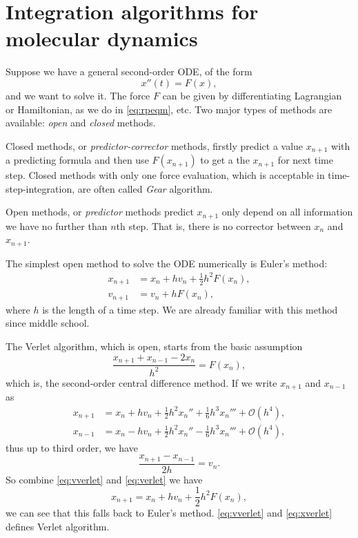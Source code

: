 
\section{Integration algorithms for molecular dynamics}

Suppose we have a general second-order ODE, of the form
\begin{equation}
  x''(t) = F(x),
\end{equation}
and we want to solve it. The force $F$ can be given by differentiating Lagrangian or Hamiltonian, as we do in \eqref{eq:rpeqm}, etc. Two major types of methods are
available: \textit{open} and \textit{closed} methods.

Closed methods, or \textit{predictor-corrector} methods, firstly predict a value
$x_{n+1}$ with a predicting formula and then use $F(x_{n+1})$ to get a the $x_{n+1}$
for next time step. Closed methods with only one force evaluation, which is acceptable in time-step-integration,
are often called \textit{Gear} algorithm.

Open methods, or \textit{predictor} methods predict $x_{n+1}$ only depend on all
information we have no further than $n$th step. That is, there is no corrector between
$x_{n}$ and $x_{n+1}$.

The simplest  open method to solve the ODE numerically is Euler's method:
\begin{align}
x_{n+1} &= x_n + h v_n + \frac{ 1 }{ 2 } h^2 F(x_n),\\
v_{n+1} &= v_n + h F(x_n),
\end{align}
where $h$ is the length of a time step. We are already familiar with this method
since middle school.

The Verlet algorithm, which is open, starts from the basic assumption
\begin{equation}\label{eq:verlet}
	\frac{ x_{n+1} + x_{n-1} - 2 x_n }{ h^2 } = F(x_n),
\end{equation}
which is, the second-order central difference method.
If we write $x_{n+1}$ and $x_{n-1}$ as
\begin{align}
 x_{n+1} &= x_n + h v_n + \frac{ 1 }{ 2 } h^2 x_n'' + \frac{ 1 }{ 6 } h^3 x_n''' + \mathcal{O}(h^4),\\
 x_{n-1} &= x_n - h v_n + \frac{ 1 }{ 2 } h^2 x_n'' - \frac{ 1 }{ 6 } h^3 x_n''' + \mathcal{O}(h^4),
\end{align}
thus up to third order, we have
\begin{equation}\label{eq:vverlet}
 \frac{x_{n+1} - x_{n-1}}{2h} =  v_n.
\end{equation}
So combine \eqref{eq:vverlet} and \eqref{eq:verlet} we have
\begin{equation}\label{eq:xverlet}
  x_{n+1} = x_{n} + h v_{n} + \frac{ 1 }{ 2 } h^2 F(x_n),
\end{equation}
we can see that this falls back to Euler's method. \eqref{eq:vverlet} and \eqref{eq:xverlet}
defines Verlet algorithm.

